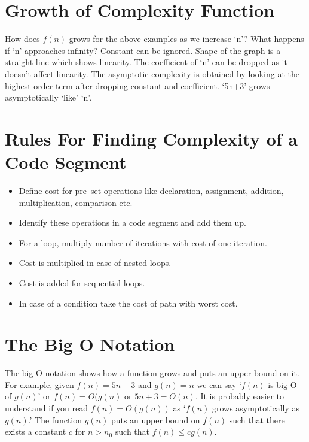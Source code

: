 \documentclass[12pt,a4paper]{article}
\begin{document}
\section{Growth of Complexity Function}
How does $f(n)$ grows for the above examples as we increase `n'? What happens if `n' approaches infinity? Constant can be ignored. Shape of the graph is a straight line which shows linearity. The coefficient of `n' can be dropped as it doesn't affect linearity. The asymptotic complexity is obtained by looking at the highest order term after dropping constant and coefficient. `5n+3' grows asymptotically `like' `n'.
\section{Rules For Finding Complexity of a Code Segment}
\begin{itemize}
\item Define cost for pre--set operations like declaration, assignment, addition, multiplication, comparison etc.
\item Identify these operations in a code segment and add them up.
\item For a loop, multiply number of iterations with cost of one iteration.
\item Cost is multiplied in case of nested loops.
\item Cost is added for sequential loops.
\item In case of a condition take the cost of path with worst cost.
\end{itemize}
\section{The Big O Notation}
The big O notation shows how a function grows and puts an upper bound on it. For example, given $f(n)=5n+3$ and $g(n)=n$ we can say `$f(n)$ is big O of $g(n)$' or $f(n)=O(g(n)$ or $5n+3=O(n)$. It is probably easier to understand if you read $f(n)=O(g(n))$ as `$f(n)$ grows asymptotically as $g(n)$.' The function $g(n)$ puts an upper bound on $f(n)$ such that there exists a constant $c$ for $n>n_0$ such that $f(n)\leq cg(n)$.
\end{document}
